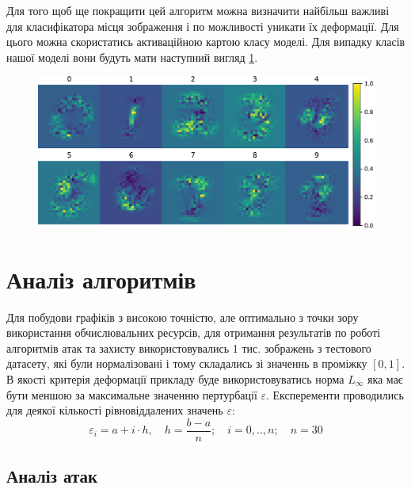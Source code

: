 \documentclass[a4paper,14pt]{extreport}
\begin{document}
	Для того щоб ще покращити цей алгоритм можна визначити найбільш важливі для класифікатора місця зображення і по можливості уникати їх деформації. Для цього можна скористатись активаційною картою класу моделі. Для випадку класів нашої моделі вони будуть мати наступний вигляд \ref{fig:classactivationmap}.
	\begin{figure}[h]
		\centering
		\includegraphics[width=\textwidth]{resources/classactivationmap.pdf}
		\caption{}
		\label{fig:classactivationmap}
	\end{figure}
	
	\chapter{Аналіз алгоритмів}
	Для побудови графіків з високою точністю, але оптимально з точки зору використання обчислювальних ресурсів, для отримання результатів по роботі алгоритмів атак та захисту використовувались 1 тис. зображень з тестового датасету, які були нормалізовані і тому складались зі значеннь в проміжку $[0, 1]$. В якості критерія деформації прикладу буде використовуватись норма $L_{\infty}$ яка має бути меншою за максимальне значенню пертурбації $\varepsilon$. Експеременти проводились для деякої кількості рівновіддалених значень $\varepsilon$:
	$$\varepsilon_{i}=a + i \cdot h, \quad h=\frac{b - a}{n}; \quad i=0,..,n; \quad n=30$$
	\section{Аналіз атак}
	
\end{document}
